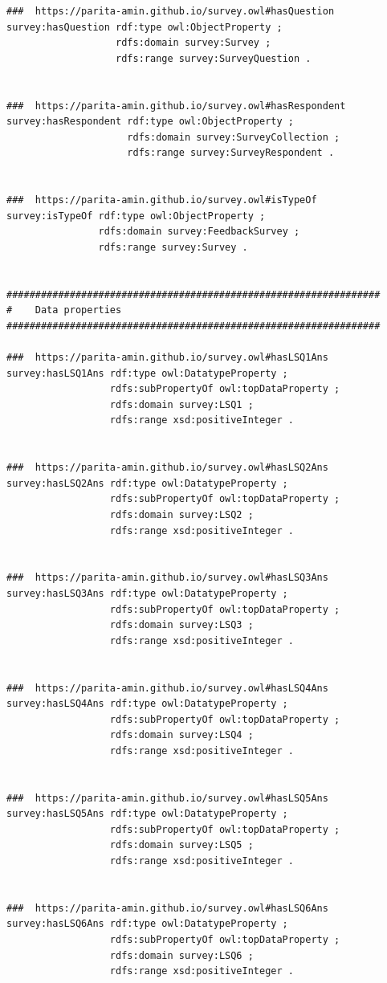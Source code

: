 \begin{lstlisting}
###  https://parita-amin.github.io/survey.owl#hasQuestion
survey:hasQuestion rdf:type owl:ObjectProperty ;
                   rdfs:domain survey:Survey ;
                   rdfs:range survey:SurveyQuestion .


###  https://parita-amin.github.io/survey.owl#hasRespondent
survey:hasRespondent rdf:type owl:ObjectProperty ;
                     rdfs:domain survey:SurveyCollection ;
                     rdfs:range survey:SurveyRespondent .


###  https://parita-amin.github.io/survey.owl#isTypeOf
survey:isTypeOf rdf:type owl:ObjectProperty ;
                rdfs:domain survey:FeedbackSurvey ;
                rdfs:range survey:Survey .


#################################################################
#    Data properties
#################################################################

###  https://parita-amin.github.io/survey.owl#hasLSQ1Ans
survey:hasLSQ1Ans rdf:type owl:DatatypeProperty ;
                  rdfs:subPropertyOf owl:topDataProperty ;
                  rdfs:domain survey:LSQ1 ;
                  rdfs:range xsd:positiveInteger .


###  https://parita-amin.github.io/survey.owl#hasLSQ2Ans
survey:hasLSQ2Ans rdf:type owl:DatatypeProperty ;
                  rdfs:subPropertyOf owl:topDataProperty ;
                  rdfs:domain survey:LSQ2 ;
                  rdfs:range xsd:positiveInteger .


###  https://parita-amin.github.io/survey.owl#hasLSQ3Ans
survey:hasLSQ3Ans rdf:type owl:DatatypeProperty ;
                  rdfs:subPropertyOf owl:topDataProperty ;
                  rdfs:domain survey:LSQ3 ;
                  rdfs:range xsd:positiveInteger .


###  https://parita-amin.github.io/survey.owl#hasLSQ4Ans
survey:hasLSQ4Ans rdf:type owl:DatatypeProperty ;
                  rdfs:subPropertyOf owl:topDataProperty ;
                  rdfs:domain survey:LSQ4 ;
                  rdfs:range xsd:positiveInteger .


###  https://parita-amin.github.io/survey.owl#hasLSQ5Ans
survey:hasLSQ5Ans rdf:type owl:DatatypeProperty ;
                  rdfs:subPropertyOf owl:topDataProperty ;
                  rdfs:domain survey:LSQ5 ;
                  rdfs:range xsd:positiveInteger .


###  https://parita-amin.github.io/survey.owl#hasLSQ6Ans
survey:hasLSQ6Ans rdf:type owl:DatatypeProperty ;
                  rdfs:subPropertyOf owl:topDataProperty ;
                  rdfs:domain survey:LSQ6 ;
                  rdfs:range xsd:positiveInteger .



\end{lstlisting}
